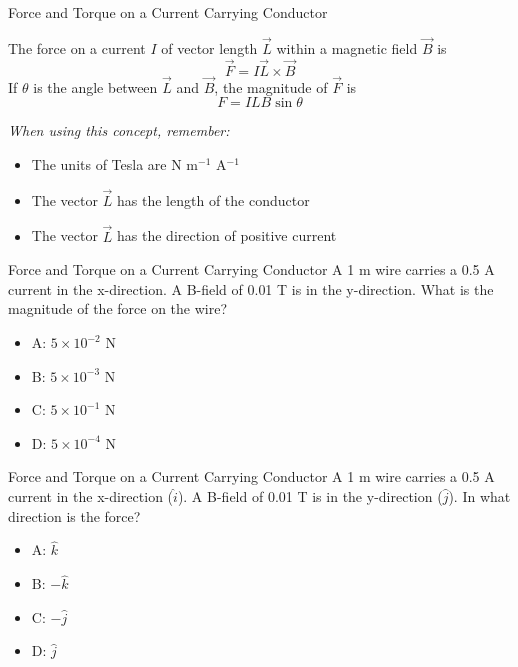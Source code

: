 \documentclass{beamer}
\begin{document}
\begin{frame}{Force and Torque on a Current Carrying Conductor}
\small
\begin{tcolorbox}[colback=white,colframe=gray,title=Lorentz Force on Current Carrying Conductor]
\alert{The force on a current $I$ of vector length $\vec{L}$ within a magnetic field $\vec{B}$ is
\begin{equation}
\vec{F} = I \vec{L} \times \vec{B}
\end{equation}
If $\theta$ is the angle between $\vec{L}$ and $\vec{B}$, the magnitude of $\vec{F}$ is 
\begin{equation}
F = ILB \sin\theta
\end{equation}}
\end{tcolorbox}
\footnotesize
\textit{When using this concept, remember:}
\begin{itemize}
\item The units of Tesla are N m$^{-1}$ A$^{-1}$
\item The vector $\vec{L}$ has the length of the conductor
\item The vector $\vec{L}$ has the direction of positive current
\end{itemize}
\end{frame}

\begin{frame}{Force and Torque on a Current Carrying Conductor}
A 1 m wire carries a 0.5 A current in the x-direction.  A B-field of 0.01 T is in the y-direction.  What is the magnitude of the force on the wire?
\begin{itemize}
\item A: $5 \times 10^{-2}$ N
\item B: $5 \times 10^{-3}$ N
\item C: $5 \times 10^{-1}$ N
\item D: $5 \times 10^{-4}$ N
\end{itemize}
\end{frame}

\begin{frame}{Force and Torque on a Current Carrying Conductor}
A 1 m wire carries a 0.5 A current in the x-direction ($\hat{i}$).  A B-field of 0.01 T is in the y-direction ($\hat{j}$).  In what direction is the force?
\begin{itemize}
\item A: $\hat{k}$
\item B: $-\hat{k}$
\item C: $-\hat{j}$
\item D: $\hat{j}$
\end{itemize}
\end{frame}
\end{document}
